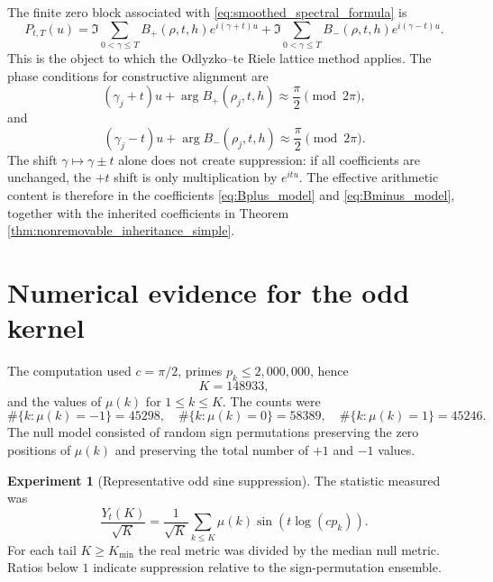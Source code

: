 \documentclass[11pt]{amsart}
\numberwithin{equation}{section}
\theoremstyle{plain}
\theoremstyle{definition}
\newtheorem{experiment}[theorem]{Experiment}
\theoremstyle{remark}
\begin{document}
The finite zero block associated with \eqref{eq:smoothed_spectral_formula}
is
\begin{equation}
P_{t,T}(u)=
\Im\sum_{0<\gamma\le T}B_+(\rho,t,h)e^{i(\gamma+t)u}
+\Im\sum_{0<\gamma\le T}B_-(\rho,t,h)e^{i(\gamma-t)u}.
\label{eq:finite_zero_block}
\end{equation}
This is the object to which the Odlyzko--te Riele lattice method applies.
The phase conditions for constructive alignment are
\begin{equation}
(\gamma_j+t)u+\arg B_+(\rho_j,t,h)\approx \frac{\pi}{2}
\pmod{2\pi},
\label{eq:alignment_plus}
\end{equation}
and
\begin{equation}
(\gamma_j-t)u+\arg B_-(\rho_j,t,h)\approx \frac{\pi}{2}
\pmod{2\pi}.
\label{eq:alignment_minus}
\end{equation}
The shift $\gamma\mapsto\gamma\pm t$ alone does not create suppression:
if all coefficients are unchanged, the $+t$ shift is only multiplication
by $e^{itu}$.  The effective arithmetic content is therefore in the
coefficients \eqref{eq:Bplus_model} and \eqref{eq:Bminus_model}, together
with the inherited coefficients in Theorem \ref{thm:nonremovable_inheritance_simple}.

\section{Numerical evidence for the odd kernel}
\label{sec:numerical_evidence}

The computation used $c=\pi/2$, primes $p_k\le 2,000,000$, hence
\begin{equation}
K=148933,
\label{eq:numerical_K_value}
\end{equation}
and the values of $\mu(k)$ for $1\le k\le K$.  The counts were
\begin{equation}
\#\{k:\mu(k)=-1\}=45298,
\quad
\#\{k:\mu(k)=0\}=58389,
\quad
\#\{k:\mu(k)=1\}=45246.
\label{eq:numerical_mobius_counts}
\end{equation}
The null model consisted of random sign permutations preserving the zero
positions of $\mu(k)$ and preserving the total number of $+1$ and $-1$
values.


\begin{experiment}[Representative odd sine suppression]
\label{exp:representative_suppression}
The statistic measured was
\begin{equation}
\frac{Y_t(K)}{\sqrt K}
=\frac{1}{\sqrt K}\sum_{k\le K}\mu(k)\sin(t\log(c p_k)).
\label{eq:experiment_normalized_kernel}
\end{equation}
For each tail $K\ge K_{\min}$ the real metric was divided by the median
null metric.  Ratios below $1$ indicate suppression relative to the
sign-permutation ensemble.
\end{experiment}
\end{document}

